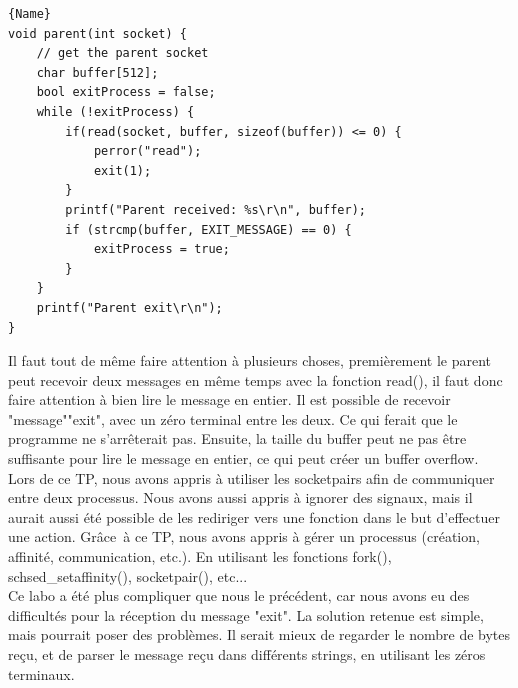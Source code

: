 \documentclass[
	a4paper, %
	10pt, %
]{CSUniSchoolLabReport}
\begin{document}
\begin{minipage}{.45\textwidth}
\begin{lstlisting}[style=CStyle, caption=Processus Parent, firstnumber=1]{Name}
void parent(int socket) {
	// get the parent socket
	char buffer[512];
	bool exitProcess = false;
	while (!exitProcess) {
		if(read(socket, buffer, sizeof(buffer)) <= 0) {
			perror("read");
			exit(1);
		}
		printf("Parent received: %s\r\n", buffer);
		if (strcmp(buffer, EXIT_MESSAGE) == 0) {
			exitProcess = true;
		}
	}
	printf("Parent exit\r\n");
}
\end{lstlisting}
\end{minipage}
Il faut tout de m\^eme faire attention \`a plusieurs choses, premi\`erement le parent peut recevoir deux messages en m\^eme temps avec la fonction read(), il faut donc faire attention à bien lire le message en entier.
Il est possible de recevoir "message""exit", avec un z\'ero terminal entre les deux. Ce qui ferait que le programme ne s'arr\^eterait pas.
Ensuite, la taille du buffer peut ne pas \^etre suffisante pour lire le message en entier, ce qui peut créer un buffer overflow.\\

Lors de ce TP, nous avons appris \`a utiliser les socketpairs afin de communiquer entre deux processus.
Nous avons aussi appris \`a ignorer des signaux, mais il aurait aussi été possible de les rediriger vers une fonction dans le but d'effectuer une action.
Gr\^ace\ \`a ce TP, nous avons appris \`a g\'erer un processus (création, affinité, communication, etc.). En utilisant les fonctions fork(), schsed\_setaffinity(), socketpair(), etc...\\

Ce labo a été plus compliquer que nous le pr\'ec\'edent, car nous avons eu des difficultés pour la r\'eception du message "exit". La solution retenue est simple, mais pourrait poser des probl\`emes.
Il serait mieux de regarder le nombre de bytes re\c{c}u, et de parser le message re\c{c}u dans diff\'erents strings, en utilisant les z\'eros terminaux.
\end{document}

